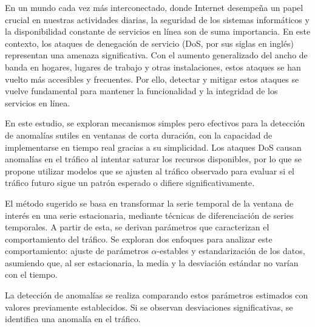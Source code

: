 En un mundo cada vez más interconectado, donde Internet desempeña un papel crucial en nuestras actividades diarias, la seguridad de los sistemas informáticos y la disponibilidad constante de servicios en línea son de suma importancia. En este contexto, los ataques de denegación de servicio (DoS, por sus siglas en inglés) representan una amenaza significativa. Con el aumento generalizado del ancho de banda en hogares, lugares de trabajo y otras instalaciones, estos ataques se han vuelto más accesibles y frecuentes.
Por ello, detectar y mitigar estos ataques se vuelve fundamental para mantener la funcionalidad y la integridad de los servicios en línea. 

En este estudio, se exploran mecanismos simples pero efectivos para la detección de anomalías sutiles en ventanas de corta duración, con la capacidad de implementarse en tiempo real gracias a su simplicidad. Los ataques DoS causan anomalías en el tráfico al intentar saturar los recursos disponibles, por lo que se propone utilizar modelos que se ajusten al tráfico observado para evaluar si el tráfico futuro sigue un patrón esperado o difiere significativamente.

El método sugerido se basa en transformar la serie temporal de la ventana de interés en una serie estacionaria, mediante técnicas de diferenciación de series temporales. A partir de esta, se derivan parámetros que caracterizan el comportamiento del tráfico. Se exploran dos enfoques para analizar este comportamiento: ajuste de parámetros $\alpha$-estables y estandarización de los datos, asumiendo que, al ser estacionaria, la media y la desviación estándar no varían con el tiempo.

La detección de anomalías se realiza comparando estos parámetros estimados con valores previamente establecidos. Si se observan desviaciones significativas, se identifica una anomalía en el tráfico.



